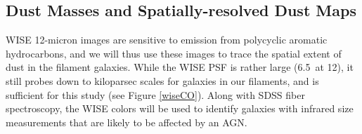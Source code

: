 \documentclass[11pt, preprint]{aastex}
\begin{document}
{%




\vspace*{-1cm}
\subsection{Dust Masses and Spatially-resolved Dust Maps}
\vspace*{-.3cm}
\label{wise}
WISE 12-micron images are sensitive to emission from polycyclic
aromatic hydrocarbons, and we will thus use these images to trace the spatial extent of dust in the filament galaxies.  
While the WISE PSF is rather large
(6.5\arcsec \ at 12\micron), it
still probes down to kiloparsec scales for galaxies in our filaments,
and is sufficient for this study (see Figure \ref{wiseCO}).   Along with SDSS fiber
spectroscopy, the WISE colors will be used to identify galaxies with
infrared size measurements that are likely to be affected by an AGN.


}
\end{document}
